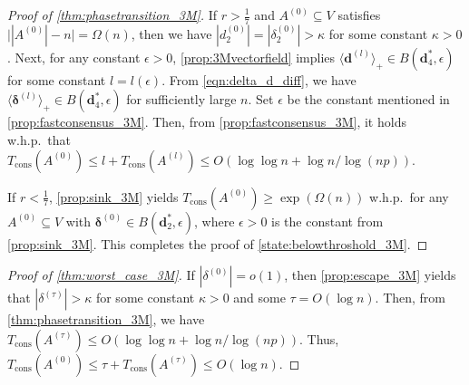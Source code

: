 \documentclass[letterpaper,11pt]{article}
\newcommand{\Tcons}{T_{\mathrm{cons}}}
\newcommand*{\absp}[1]{\langle #1 \rangle_+}
\renewcommand\Pr{\mathop{\mathbf{Pr}}}
\def\defeq{\mathrel{\mathop:}=}%
\begin{document}
\begin{proof}[Proof of \cref{thm:phasetransition_3M}]
If $r>\frac{1}{7}$ and $A^{(0)}\subseteq V$ satisfies $\bigl| |A^{(0)}|-n \bigr| = \Omega(n)$, then we have $|d^{(0)}_2|=|\delta^{(0)}_2|>\kappa$ for some constant $\kappa>0$.
Next, for any constant $\epsilon>0$, \cref{prop:3Mvectorfield} implies $\absp{\mathbf{d}^{(l)}} \in B(\mathbf{d}^*_4,\epsilon)$ for some constant $l=l(\epsilon)$.
From \cref{eqn:delta_d_diff}, we have $\absp{{\boldsymbol \delta}^{(l)}}\in B(\mathbf{d}^*_4,\epsilon)$ for sufficiently large $n$. 
Set $\epsilon$ be the constant mentioned in \cref{prop:fastconsensus_3M}. 
Then, from \cref{prop:fastconsensus_3M}, it holds w.h.p.~that $\Tcons(A^{(0)}) \leq l+\Tcons(A^{(l)}) \leq O(\log\log n+\log n/\log (np))$.

If $r<\frac{1}{7}$, \cref{prop:sink_3M} yields $\Tcons(A^{(0)}) \geq \exp(\Omega(n))$ w.h.p.~for any $A^{(0)}\subseteq V$ with ${\boldsymbol \delta}^{(0)} \in B(\mathbf{d}^*_2,\epsilon)$, where $\epsilon>0$ is the constant from \cref{prop:sink_3M}.
This completes the proof of \ref{state:belowthroshold_3M}.
\end{proof}



\begin{proof}[Proof of \cref{thm:worst_case_3M}]
If $|\delta^{(0)}|=o(1)$, then \cref{prop:escape_3M} yields that $|\delta^{(\tau)}|>\kappa$ for some constant $\kappa>0$ and some $\tau=O(\log n)$.
Then, from \cref{thm:phasetransition_3M}, we have $\Tcons(A^{(\tau)})\leq O(\log\log n+\log n/\log (np))$.
Thus, $\Tcons(A^{(0)})\leq \tau + \Tcons(A^{(\tau)}) \leq O(\log n)$.
\end{proof}
%
%
\begin{figure}[h]
\begin{figure}[omitted: a diagram of this paper's results, not reproduced here]\label{fig:organization}\end{figure}
\end{figure}
%


\end{document}
